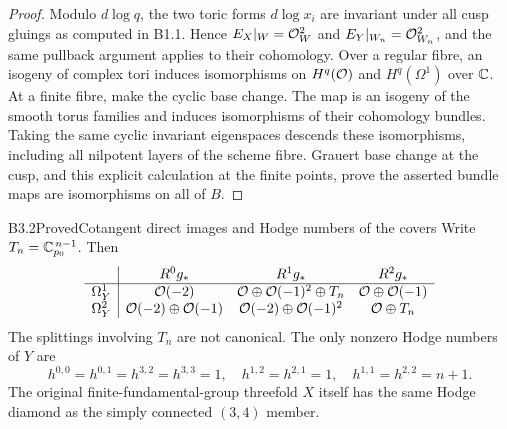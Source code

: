 \begin{proof}
Modulo $d\log q$, the two toric forms $d\log x_i$ are invariant
under all cusp gluings as computed in B1.1. Hence
$E_X|_W=\mathcal O_W^2$ and $E_Y|_{W_n}=\mathcal O_{W_n}^2$,
and the same pullback argument applies to their cohomology.
Over a regular fibre, an isogeny of complex tori induces isomorphisms
on $H^q(\mathcal O)$ and $H^q(\Omega^1)$ over $\mathbb C$.
At a finite fibre, make the cyclic base change. The map is an isogeny
of the smooth torus families and induces isomorphisms of their
cohomology bundles. Taking the same cyclic invariant eigenspaces
descends these isomorphisms, including all nilpotent layers of the
scheme fibre. Grauert base change at the cusp, and this explicit
calculation at the finite points, prove the asserted bundle maps are
isomorphisms on all of $B$.
\end{proof}

\begin{claim}{B3.2}{Proved}{Cotangent direct images and Hodge numbers of the covers}
Write $T_n=\mathbb C_{p_0}^{\,n-1}$. Then
\[
\begin{array}{c|ccc}
 &R^0g_*&R^1g_*&R^2g_*\\\hline
\Omega^1_Y&\mathcal O(-2)&\mathcal O\oplus\mathcal O(-1)^2\oplus T_n&\mathcal O\oplus\mathcal O(-1)\\
\Omega^2_Y&\mathcal O(-2)\oplus\mathcal O(-1)&\mathcal O(-2)\oplus\mathcal O(-1)^2&\mathcal O\oplus T_n
\end{array}
\]
The splittings involving $T_n$ are not canonical.
The only nonzero Hodge numbers of $Y$ are
\[
h^{0,0}=h^{0,1}=h^{3,2}=h^{3,3}=1,\quad
h^{1,2}=h^{2,1}=1,\quad h^{1,1}=h^{2,2}=n+1.
\]
The original finite-fundamental-group threefold $X$ itself has the
same Hodge diamond as the simply connected $(3,4)$ member.
\end{claim}

